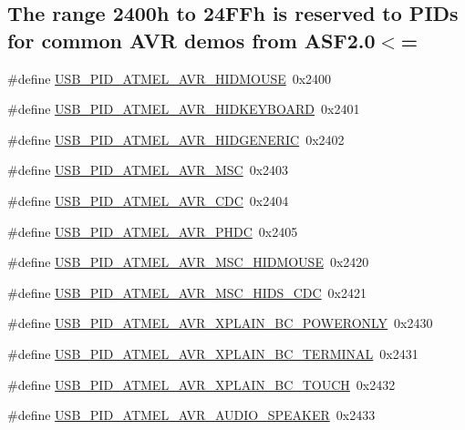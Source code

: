 \subsection*{\-The range 2400h to 24\-F\-Fh is reserved to \-P\-I\-Ds for common \-A\-V\-R demos from \-A\-S\-F2.0$<$=}
\begin{DoxyCompactItemize}
\item 
\#define \hyperlink{group__usb__atmel__ids__group_gaaf3a5a5c1184945d22db685819751a38}{\-U\-S\-B\-\_\-\-P\-I\-D\-\_\-\-A\-T\-M\-E\-L\-\_\-\-A\-V\-R\-\_\-\-H\-I\-D\-M\-O\-U\-S\-E}~0x2400
\item 
\#define \hyperlink{group__usb__atmel__ids__group_gaf8654a9ba8d7f75218bee8debe1ff5e3}{\-U\-S\-B\-\_\-\-P\-I\-D\-\_\-\-A\-T\-M\-E\-L\-\_\-\-A\-V\-R\-\_\-\-H\-I\-D\-K\-E\-Y\-B\-O\-A\-R\-D}~0x2401
\item 
\#define \hyperlink{group__usb__atmel__ids__group_ga71addefe96b17b424911d0e6999e7ec2}{\-U\-S\-B\-\_\-\-P\-I\-D\-\_\-\-A\-T\-M\-E\-L\-\_\-\-A\-V\-R\-\_\-\-H\-I\-D\-G\-E\-N\-E\-R\-I\-C}~0x2402
\item 
\#define \hyperlink{group__usb__atmel__ids__group_gae34ec609c2a8010baca95d702b2f59f9}{\-U\-S\-B\-\_\-\-P\-I\-D\-\_\-\-A\-T\-M\-E\-L\-\_\-\-A\-V\-R\-\_\-\-M\-S\-C}~0x2403
\item 
\#define \hyperlink{group__usb__atmel__ids__group_gab3ec3147b9741f7d90ae165e592e7361}{\-U\-S\-B\-\_\-\-P\-I\-D\-\_\-\-A\-T\-M\-E\-L\-\_\-\-A\-V\-R\-\_\-\-C\-D\-C}~0x2404
\item 
\#define \hyperlink{group__usb__atmel__ids__group_gae64a8c0cdbbd1f21fc7fe847ff876fbe}{\-U\-S\-B\-\_\-\-P\-I\-D\-\_\-\-A\-T\-M\-E\-L\-\_\-\-A\-V\-R\-\_\-\-P\-H\-D\-C}~0x2405
\item 
\#define \hyperlink{group__usb__atmel__ids__group_ga12d14a92af20179a6a0c59c26b842bd9}{\-U\-S\-B\-\_\-\-P\-I\-D\-\_\-\-A\-T\-M\-E\-L\-\_\-\-A\-V\-R\-\_\-\-M\-S\-C\-\_\-\-H\-I\-D\-M\-O\-U\-S\-E}~0x2420
\item 
\#define \hyperlink{group__usb__atmel__ids__group_ga0735712fd6c9858f62be70c8224c2059}{\-U\-S\-B\-\_\-\-P\-I\-D\-\_\-\-A\-T\-M\-E\-L\-\_\-\-A\-V\-R\-\_\-\-M\-S\-C\-\_\-\-H\-I\-D\-S\-\_\-\-C\-D\-C}~0x2421
\item 
\#define \hyperlink{group__usb__atmel__ids__group_ga3479e9edd38bb8c19e6dd4bea38bf284}{\-U\-S\-B\-\_\-\-P\-I\-D\-\_\-\-A\-T\-M\-E\-L\-\_\-\-A\-V\-R\-\_\-\-X\-P\-L\-A\-I\-N\-\_\-\-B\-C\-\_\-\-P\-O\-W\-E\-R\-O\-N\-L\-Y}~0x2430
\item 
\#define \hyperlink{group__usb__atmel__ids__group_gad6a7e99331d3b65fe1747628dd8b7257}{\-U\-S\-B\-\_\-\-P\-I\-D\-\_\-\-A\-T\-M\-E\-L\-\_\-\-A\-V\-R\-\_\-\-X\-P\-L\-A\-I\-N\-\_\-\-B\-C\-\_\-\-T\-E\-R\-M\-I\-N\-A\-L}~0x2431
\item 
\#define \hyperlink{group__usb__atmel__ids__group_ga146f3df61ba502c5c4f93a4e03d7c52c}{\-U\-S\-B\-\_\-\-P\-I\-D\-\_\-\-A\-T\-M\-E\-L\-\_\-\-A\-V\-R\-\_\-\-X\-P\-L\-A\-I\-N\-\_\-\-B\-C\-\_\-\-T\-O\-U\-C\-H}~0x2432
\item 
\#define \hyperlink{group__usb__atmel__ids__group_gae43a0f16da456b368f146e6f1b1e920b}{\-U\-S\-B\-\_\-\-P\-I\-D\-\_\-\-A\-T\-M\-E\-L\-\_\-\-A\-V\-R\-\_\-\-A\-U\-D\-I\-O\-\_\-\-S\-P\-E\-A\-K\-E\-R}~0x2433
\end{DoxyCompactItemize}
